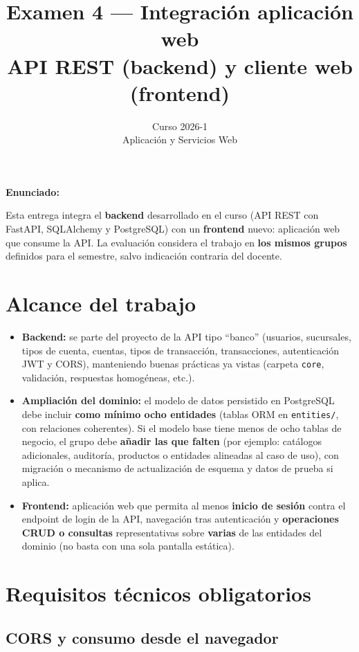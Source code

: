 \documentclass[11pt,a4paper]{article}
\title{Examen 4 --- Integración aplicación web \\ API REST (backend) y cliente web (frontend)}
\author{Curso 2026-1 \\ Aplicación y Servicios Web}
\date{}
\newenvironment{enunciado}{\begin{leftbar}\noindent\textbf{Enunciado:}\par\vspace{0.3em}}{\end{leftbar}}
\begin{document}
\maketitle
\thispagestyle{empty}
\vspace{1em}

\begin{enunciado}
Esta entrega integra el \textbf{backend} desarrollado en el curso (API REST con FastAPI, SQLAlchemy y PostgreSQL) con un \textbf{frontend} nuevo: aplicación web que consume la API. La evaluación considera el trabajo en \textbf{los mismos grupos} definidos para el semestre, salvo indicación contraria del docente.
\end{enunciado}

\section{Alcance del trabajo}

\begin{itemize}[leftmargin=*]
  \item \textbf{Backend:} se parte del proyecto de la API tipo ``banco'' (usuarios, sucursales, tipos de cuenta, cuentas, tipos de transacción, transacciones, autenticación JWT y CORS), manteniendo buenas prácticas ya vistas (carpeta \texttt{core}, validación, respuestas homogéneas, etc.).
  \item \textbf{Ampliación del dominio:} el modelo de datos persistido en PostgreSQL debe incluir \textbf{como mínimo ocho entidades} (tablas ORM en \texttt{entities/}, con relaciones coherentes). Si el modelo base tiene menos de ocho tablas de negocio, el grupo debe \textbf{añadir las que falten} (por ejemplo: catálogos adicionales, auditoría, productos o entidades alineadas al caso de uso), con migración o mecanismo de actualización de esquema y datos de prueba si aplica.
  \item \textbf{Frontend:} aplicación web que permita al menos \textbf{inicio de sesión} contra el endpoint de login de la API, navegación tras autenticación y \textbf{operaciones CRUD o consultas} representativas sobre \textbf{varias} de las entidades del dominio (no basta con una sola pantalla estática).
\end{itemize}

\section{Requisitos técnicos obligatorios}

\subsection{CORS y consumo desde el navegador}
\end{document}
